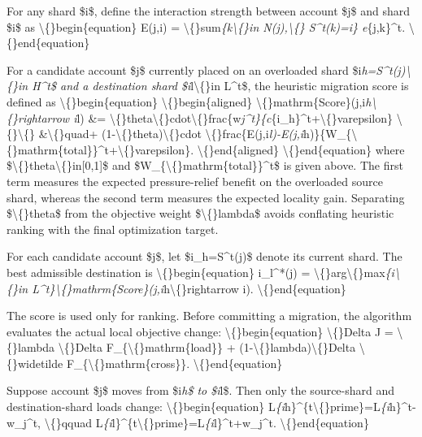 \documentclass{article}
\begin{document}
For any shard \$i\$, define the interaction strength between account \$j\$ and shard \$i\$ as
\textbackslash\{\}begin\{equation\}
E(j,i)
=
\textbackslash\{\}sum\emph{\{k\textbackslash\{\}in N(j),\textbackslash\{\} S^t(k)=i\} e}\{j,k\}^t.
\textbackslash\{\}end\{equation\}

For a candidate account \$j\$ currently placed on an overloaded shard \$i\emph{h=S^t(j)\textbackslash\{\}in H^t\$ and a destination shard \$i}l\textbackslash\{\}in L^t\$, the heuristic migration score is defined as
\textbackslash\{\}begin\{equation\}
\textbackslash\{\}begin\{aligned\}
\textbackslash\{\}mathrm\{Score\}(j,i\emph{h\textbackslash\{\}rightarrow i}l)
\&=
\textbackslash\{\}theta\textbackslash\{\}cdot\textbackslash\{\}frac\{w\emph{j^t\}\{c}\{i\_h\}^t+\textbackslash\{\}varepsilon\} \textbackslash\{\}\textbackslash\{\}
\&\textbackslash\{\}quad+
(1-\textbackslash\{\}theta)\textbackslash\{\}cdot
\textbackslash\{\}frac\{E(j,i\emph{l)-E(j,i}h)\}\{W\_\{\textbackslash\{\}mathrm\{total\}\}^t+\textbackslash\{\}varepsilon\}.
\textbackslash\{\}end\{aligned\}
\textbackslash\{\}end\{equation\}
where \$\textbackslash\{\}theta\textbackslash\{\}in[0,1]\$ and \$W\_\{\textbackslash\{\}mathrm\{total\}\}^t\$ is given above. The first term measures the expected pressure-relief benefit on the overloaded source shard, whereas the second term measures the expected locality gain. Separating \$\textbackslash\{\}theta\$ from the objective weight \$\textbackslash\{\}lambda\$ avoids conflating heuristic ranking with the final optimization target.

For each candidate account \$j\$, let \$i\_h=S^t(j)\$ denote its current shard. The best admissible destination is
\textbackslash\{\}begin\{equation\}
i\_l^*(j)
=
\textbackslash\{\}arg\textbackslash\{\}max\emph{\{i\textbackslash\{\}in L^t\}\textbackslash\{\}mathrm\{Score\}(j,i}h\textbackslash\{\}rightarrow i).
\textbackslash\{\}end\{equation\}

The score is used only for ranking. Before committing a migration, the algorithm evaluates the actual local objective change:
\textbackslash\{\}begin\{equation\}
\textbackslash\{\}Delta J
=
\textbackslash\{\}lambda \textbackslash\{\}Delta F\_\{\textbackslash\{\}mathrm\{load\}\}
+
(1-\textbackslash\{\}lambda)\textbackslash\{\}Delta \textbackslash\{\}widetilde F\_\{\textbackslash\{\}mathrm\{cross\}\}.
\textbackslash\{\}end\{equation\}

Suppose account \$j\$ moves from \$i\emph{h\$ to \$i}l\$. Then only the source-shard and destination-shard loads change:
\textbackslash\{\}begin\{equation\}
L\emph{\{i}h\}^\{t\textbackslash\{\}prime\}=L\emph{\{i}h\}^t-w\_j^t,
\textbackslash\{\}qquad
L\emph{\{i}l\}^\{t\textbackslash\{\}prime\}=L\emph{\{i}l\}^t+w\_j^t.
\textbackslash\{\}end\{equation\}
\end{document}
